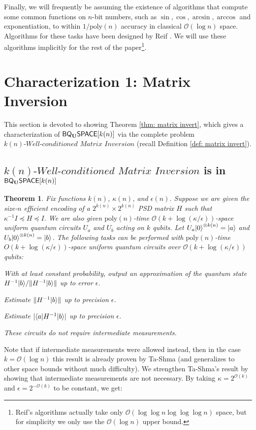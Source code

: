 \documentclass[11pt]{article}
\newtheorem{theorem}{Theorem}
\theoremstyle{definition}
\theoremstyle{remark}
\newcommand\matrixinvert[1]{{\ensuremath{#1}}\textit{-Well-conditioned Matrix Inversion}}
\newcommand{\classfont}{\sf}
\newcommand{\Unitary}{\mathbf{U}}
\newcommand{\unitaryBQSPACE}[1]{{\classfont{BQ}_\Unitary\classfont{SPACE}}[#1]}
\newcommand\bigoh{\mathcal{O}}
\newcommand{\poly}{\textrm{poly}}
\begin{document}
Finally, we will frequently be assuming the existence of  algorithms that compute some common functions on $n$-bit numbers, such as $\sin,\cos,\arcsin,\arccos$ and exponentiation, to within $1/\poly(n)$ accuracy in classical $\bigoh (\log{n})$ space.  Algorithms for these tasks have been designed by Reif \cite{reif}. We will use these algorithms implicitly for the rest of the paper\footnote{Reif's algorithms actually take only $\bigoh (\log\log{n}\log\log\log{n})$ space, but for simplicity we only use the $\bigoh (\log{n})$ upper bound.}.

\section{Characterization 1: Matrix Inversion}
This section is devoted to showing Theorem \ref{thm: matrix invert}, which gives a characterization of $\unitaryBQSPACE{k(n)}$ via the complete problem $\matrixinvert{k(n)}$ (recall Definition \ref{def: matrix invert}). %
\subsection{$\matrixinvert{k(n)}$ is in $\unitaryBQSPACE{k(n)}$} \label{sec: matrix inversion alg}
\begin{theorem} \label{thm: matrix inversion alg}
Fix functions $k(n)$, $\kappa(n)$, and $\epsilon(n)$. Suppose we are given the size-$n$ efficient encoding of a $2^{k(n)} \times 2^{k(n)}$ PSD matrix $H$ such that $\kappa^{-1} I \preceq H \preceq I$. We are also given $\poly(n)$-time $\mathcal{O}(k+\log(\kappa/\epsilon))$-space uniform quantum circuits $U_a$ and $U_b$ acting on $k$ qubits. Let $U_a{\left\vert{0}\right\rangle}^{\otimes k(n)} = {\left\vert{a}\right\rangle}$ and $U_b{\left\vert{0}\right\rangle}^{\otimes k(n)} = {\left\vert{b}\right\rangle}$. The following tasks can be performed with $\poly(n)$-time $O(k+\log(\kappa/\epsilon))$-space uniform quantum circuits over $\bigoh (k+\log(\kappa/\epsilon))$ qubits:
\begin{compactenum}
\item With at least constant probability, output an approximation of the quantum state $H^{-1}{\left\vert{b}\right\rangle} / \|H^{-1}{\left\vert{b}\right\rangle}\|$ up to error $\epsilon$.
\item Estimate $\|H^{-1}{\left\vert{b}\right\rangle}\|$ up to precision $\epsilon$.
\item Estimate  $|{\left\langle{a}\right\vert}H^{-1}{\left\vert{b}\right\rangle}|$ up to precision $\epsilon$.
\end{compactenum}
These circuits do not require intermediate measurements.
\end{theorem}
Note that if intermediate measurements were allowed instead, then in the case $k = \mathcal{O}(\log n)$ this result is already proven by Ta-Shma \cite[Theorem~6.3]{tashma} (and generalizes to other space bounds without much difficulty). We strengthen Ta-Shma's result by showing that intermediate measurements are not necessary. By taking $\kappa = 2^{\bigoh (k)}$ and $\epsilon = 2^{-\bigoh (k)}$ to be constant, we get: 
\end{document}
